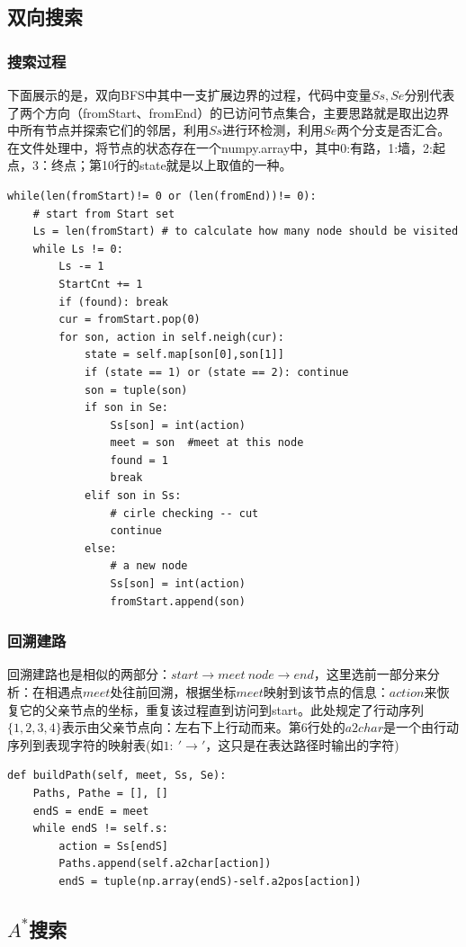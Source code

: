 \documentclass{article}
\begin{document}
\begin{CJK}{UTF8}{gbsn}
	\subsection{双向搜索}
	\subsubsection{搜索过程}
	下面展示的是，双向BFS中其中一支扩展边界的过程，代码中变量$Ss,Se$分别代表了两个方向（fromStart、fromEnd）的已访问节点集合，主要思路就是取出边界中所有节点并探索它们的邻居，利用$Ss$进行环检测，利用$Se$两个分支是否汇合。在文件处理中，将节点的状态存在一个numpy.array中，其中0:有路，1:墙，2:起点，3：终点；第10行的state就是以上取值的一种。
	\begin{lstlisting}
while(len(fromStart)!= 0 or (len(fromEnd))!= 0):
	# start from Start set
    Ls = len(fromStart) # to calculate how many node should be visited
    while Ls != 0:
		Ls -= 1
		StartCnt += 1
		if (found): break
		cur = fromStart.pop(0)
		for son, action in self.neigh(cur):
			state = self.map[son[0],son[1]]
			if (state == 1) or (state == 2): continue
			son = tuple(son)
	        if son in Se:
           		Ss[son] = int(action)
		        meet = son	#meet at this node
				found = 1
				break                   
			elif son in Ss:
				# cirle checking -- cut
                continue
            else:
				# a new node
				Ss[son] = int(action)
				fromStart.append(son)

	\end{lstlisting}
	\subsubsection{回溯建路}
	回溯建路也是相似的两部分：$start\rightarrow meet\ node\rightarrow end$，这里选前一部分来分析：在相遇点$meet$处往前回溯，根据坐标$meet$映射到该节点的信息：$action$来恢复它的父亲节点的坐标，重复该过程直到访问到start。此处规定了行动序列$\{1,2,3,4\}$表示由父亲节点向：左右下上行动而来。第6行处的$a2char$是一个由行动序列到表现字符的映射表(如$1:\  '\rightarrow'$，这只是在表达路径时输出的字符)
	\begin{lstlisting}
def buildPath(self, meet, Ss, Se):
    Paths, Pathe = [], []
	endS = endE = meet
    while endS != self.s:
        action = Ss[endS]
        Paths.append(self.a2char[action])
        endS = tuple(np.array(endS)-self.a2pos[action])
		\end{lstlisting}
	\subsection{$A^*$搜索}

\end{CJK}
\end{document}
